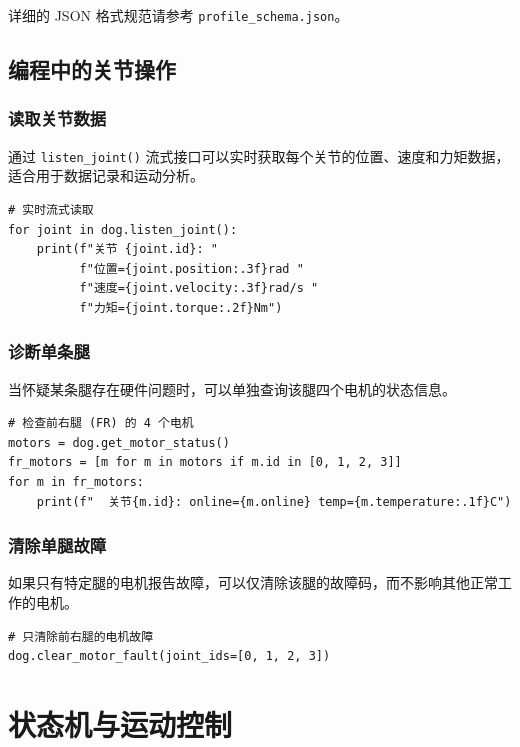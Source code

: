 \documentclass[a4paper,11pt,openany]{book}
\begin{document}
详细的 JSON 格式规范请参考 \texttt{profile\_schema.json}。

\section{编程中的关节操作}

\subsection{读取关节数据}

通过 \texttt{listen\_joint()} 流式接口可以实时获取每个关节的位置、速度和力矩数据，适合用于数据记录和运动分析。

\begin{lstlisting}[style=python]
# 实时流式读取
for joint in dog.listen_joint():
    print(f"关节 {joint.id}: "
          f"位置={joint.position:.3f}rad "
          f"速度={joint.velocity:.3f}rad/s "
          f"力矩={joint.torque:.2f}Nm")
\end{lstlisting}

\subsection{诊断单条腿}

当怀疑某条腿存在硬件问题时，可以单独查询该腿四个电机的状态信息。

\begin{lstlisting}[style=python]
# 检查前右腿 (FR) 的 4 个电机
motors = dog.get_motor_status()
fr_motors = [m for m in motors if m.id in [0, 1, 2, 3]]
for m in fr_motors:
    print(f"  关节{m.id}: online={m.online} temp={m.temperature:.1f}C")
\end{lstlisting}

\subsection{清除单腿故障}

如果只有特定腿的电机报告故障，可以仅清除该腿的故障码，而不影响其他正常工作的电机。

\begin{lstlisting}[style=python]
# 只清除前右腿的电机故障
dog.clear_motor_fault(joint_ids=[0, 1, 2, 3])
\end{lstlisting}



\chapter{状态机与运动控制}
\label{ch:fsm}
\end{document}
